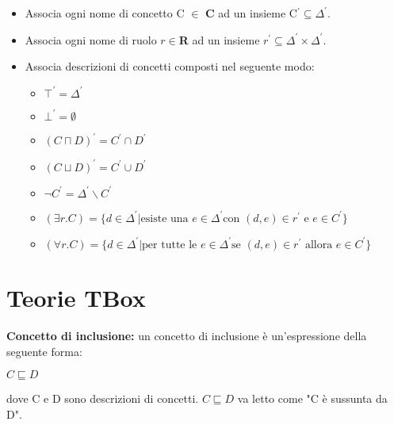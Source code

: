 \documentclass[../main.tex]{subfiles}
\begin{document}
   \begin{itemize}
      \item Associa ogni nome di concetto C $\in$ \textbf{C} ad un insieme C$^\prime \subseteq \Delta^\prime$.
      \item Associa ogni nome di ruolo $r \in$\textbf{R} ad un insieme $r^\prime \subseteq \Delta^\prime \times \Delta^\prime$.
      \item Associa descrizioni di concetti composti nel seguente modo:
      \begin{itemize}
         \item $\top^\prime = \Delta^\prime$
         \item $\bot^\prime = \emptyset$
         \item $(C \sqcap D)^\prime = C^\prime \cap D^\prime$
         \item $(C \sqcup D)^\prime = C^\prime \cup D^\prime$
         \item $\lnot C^\prime = \Delta^\prime \backslash C^\prime$
         \item $(\exists r.C) = \{ d \in \Delta^\prime | \text{esiste una } e \in \Delta^\prime \text{con } (d,e) \in r^\prime \text{ e } e \in C^\prime\}$
         \item $(\forall r.C) = \{ d \in \Delta^\prime | \text{per tutte le } e \in \Delta^\prime \text{se } (d,e) \in r^\prime \text{ allora } e \in C^\prime\}$
      \end{itemize} 
   \end{itemize}

   \section{Teorie TBox}
   \textbf{Concetto di inclusione:} un concetto di inclusione è un'espressione della seguente forma:
   \begin{center}
      $C \sqsubseteq D$
   \end{center}
   dove C e D sono descrizioni di concetti. $C \sqsubseteq D$ va letto come "C è sussunta da D".
\end{document}
